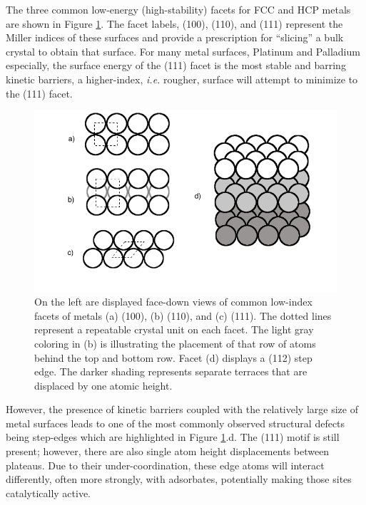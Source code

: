 The three common low-energy (high-stability) facets for FCC and HCP
metals are shown in Figure \ref{fig:facets}. The facet labels, (100),
(110), and (111) represent the Miller indices of these surfaces and provide a
prescription for ``slicing'' a bulk crystal to obtain that surface. For many
metal surfaces, Platinum and Palladium especially, the surface energy of the
(111) facet is the most stable and barring kinetic barriers, a higher-index,
{\em i.e.} rougher, surface will attempt to minimize to the (111) facet.

\begin{figure}[p!]
  \includegraphics[width=\linewidth]{../figures/chap1/facets.pdf}
  \caption{On the left are displayed face-down views of common low-index facets
of metals (a) (100), (b) (110), and (c) (111). The dotted lines represent a
repeatable crystal unit on each facet. The light gray coloring in (b) is
illustrating the placement of that row of atoms behind the top and bottom row.
Facet (d) displays a (112) step edge. The darker shading represents separate
terraces that are displaced by one atomic height.}
\label{fig:facets}
\end{figure}

However, the presence of kinetic barriers coupled with the relatively large
size of metal surfaces leads to one of the most commonly observed structural defects being
step-edges which are highlighted in Figure \ref{fig:facets}.d.  The (111) motif
is still present; however, there are also single atom height displacements
between plateaus. Due to their under-coordination, these edge atoms will
interact differently, often more strongly, with adsorbates, potentially making those sites 
catalytically active.

